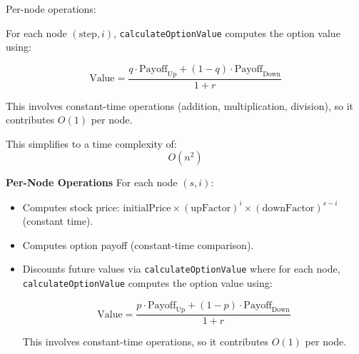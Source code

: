 \documentclass{article}
\begin{document}
    \medbreak
    Per-node operations:
    

    For each node \( ( \text{step}, i ) \), \texttt{calculateOptionValue} computes the option value using:

    \[
    \text{Value} = \frac{q \cdot \text{Payoff}_{\text{Up}} + (1 - q) \cdot \text{Payoff}_{\text{Down}}}{1 + r}
    \]

    This involves constant-time operations (addition, multiplication, division), so it contributes \( O(1) \) per node.
    
    This simplifies to a time complexity of:
    \[
    O(n^2)
    \]

    \textbf{Per-Node Operations}
    \medskip
    For each node \( (s, i) \):
    \begin{itemize}
        \item Computes stock price: \( \text{initialPrice} \times (\text{upFactor})^i \times (\text{downFactor})^{s-i} \) (constant time).
        \item Computes option payoff (constant-time comparison).
        \item Discounts future values via \texttt{calculateOptionValue} where for each node, \texttt{calculateOptionValue} computes the option value using:

        \[
        \text{Value} = \frac{p \cdot \text{Payoff}_{\text{Up}} + (1 - p) \cdot \text{Payoff}_{\text{Down}}}{1 + r}
        \]
    
        This involves constant-time operations, so it contributes \( O(1) \) per node.
    \end{itemize}
\end{document}
